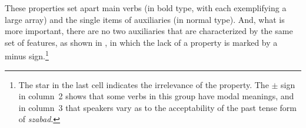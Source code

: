 \documentclass[output=paper]{langsci/langscibook}
\begin{document}
\ea\label{ex:27.12} 
    \z
\z

These properties set apart main verbs (in bold type, with each exemplifying a
large array) and the single items of auxiliaries (in normal type). And, what is
more important, there are no two auxiliaries that are characterized by the same
set of features, as shown in , in which the lack of a
property is marked by a minus sign.\footnote{The star in the last cell
    indicates the irrelevance of the property. The $\pm$ sign in column~2 shows that
    some verbs in this group have modal meanings, and in column~3 that speakers
    vary as to the acceptability of the past tense form of \emph{szabad}.}
\end{document}
